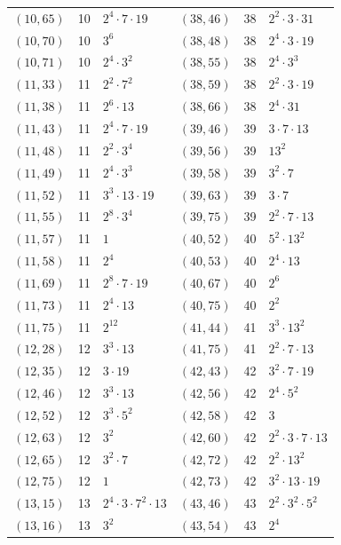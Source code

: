 \documentclass[11pt]{article}
\begin{document}
\begin{longtable}{@{}lrl@{\qquad}lrl@{}}
$(10,65)$ & 10 & $2^{4}\cdot 7\cdot 19$ & $(38,46)$ & 38 & $2^{2}\cdot 3\cdot 31$\\
$(10,70)$ & 10 & $3^{6}$ & $(38,48)$ & 38 & $2^{4}\cdot 3\cdot 19$\\
$(10,71)$ & 10 & $2^{4}\cdot 3^{2}$ & $(38,55)$ & 38 & $2^{4}\cdot 3^{3}$\\
$(11,33)$ & 11 & $2^{2}\cdot 7^{2}$ & $(38,59)$ & 38 & $2^{2}\cdot 3\cdot 19$\\
$(11,38)$ & 11 & $2^{6}\cdot 13$ & $(38,66)$ & 38 & $2^{4}\cdot 31$\\
$(11,43)$ & 11 & $2^{4}\cdot 7\cdot 19$ & $(39,46)$ & 39 & $3\cdot 7\cdot 13$\\
$(11,48)$ & 11 & $2^{2}\cdot 3^{4}$ & $(39,56)$ & 39 & $13^{2}$\\
$(11,49)$ & 11 & $2^{4}\cdot 3^{3}$ & $(39,58)$ & 39 & $3^{2}\cdot 7$\\
$(11,52)$ & 11 & $3^{3}\cdot 13\cdot 19$ & $(39,63)$ & 39 & $3\cdot 7$\\
$(11,55)$ & 11 & $2^{8}\cdot 3^{4}$ & $(39,75)$ & 39 & $2^{2}\cdot 7\cdot 13$\\
$(11,57)$ & 11 & $1$ & $(40,52)$ & 40 & $5^{2}\cdot 13^{2}$\\
$(11,58)$ & 11 & $2^{4}$ & $(40,53)$ & 40 & $2^{4}\cdot 13$\\
$(11,69)$ & 11 & $2^{8}\cdot 7\cdot 19$ & $(40,67)$ & 40 & $2^{6}$\\
$(11,73)$ & 11 & $2^{4}\cdot 13$ & $(40,75)$ & 40 & $2^{2}$\\
$(11,75)$ & 11 & $2^{12}$ & $(41,44)$ & 41 & $3^{3}\cdot 13^{2}$\\
$(12,28)$ & 12 & $3^{3}\cdot 13$ & $(41,75)$ & 41 & $2^{2}\cdot 7\cdot 13$\\
$(12,35)$ & 12 & $3\cdot 19$ & $(42,43)$ & 42 & $3^{2}\cdot 7\cdot 19$\\
$(12,46)$ & 12 & $3^{3}\cdot 13$ & $(42,56)$ & 42 & $2^{4}\cdot 5^{2}$\\
$(12,52)$ & 12 & $3^{3}\cdot 5^{2}$ & $(42,58)$ & 42 & $3$\\
$(12,63)$ & 12 & $3^{2}$ & $(42,60)$ & 42 & $2^{2}\cdot 3\cdot 7\cdot 13$\\
$(12,65)$ & 12 & $3^{2}\cdot 7$ & $(42,72)$ & 42 & $2^{2}\cdot 13^{2}$\\
$(12,75)$ & 12 & $1$ & $(42,73)$ & 42 & $3^{2}\cdot 13\cdot 19$\\
$(13,15)$ & 13 & $2^{4}\cdot 3\cdot 7^{2}\cdot 13$ & $(43,46)$ & 43 & $2^{2}\cdot 3^{2}\cdot 5^{2}$\\
$(13,16)$ & 13 & $3^{2}$ & $(43,54)$ & 43 & $2^{4}$\\

\end{longtable}
\end{document}
